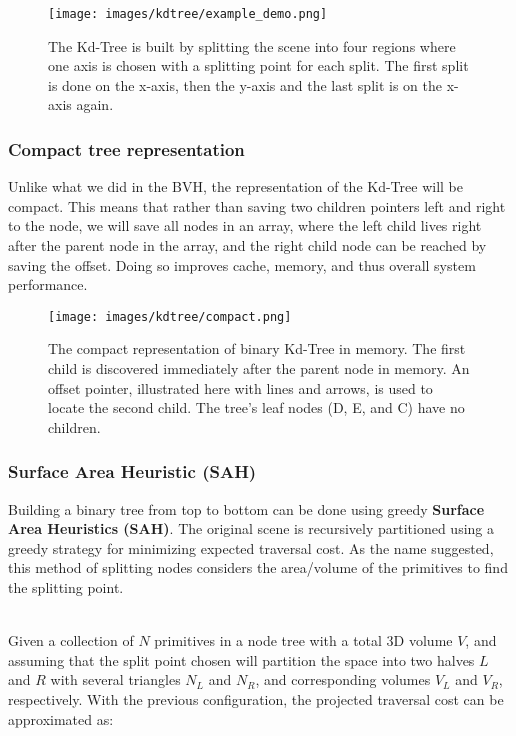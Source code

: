 \documentclass[11pt,a4paper]{article}
\begin{document}
\begin{figure}[h]	
     \centering
     \captionsetup{justification=centering,margin=2cm}
     \texttt{[image: images/kdtree/example\_demo.png]}
     \caption{The Kd-Tree is built by splitting the scene into four regions where one axis is chosen with a splitting point for each split.  The first split is done on the x-axis, then the y-axis and the last split is on the x-axis again. \protect\cite{Pharr2016}}
        \label{fig:kdtreedemo}
\end{figure}



\subsubsection{Compact tree representation}
Unlike what we did in the BVH, the representation of the Kd-Tree will be compact. This means that rather than saving two children pointers left and right to the node, we will save all nodes in an array, where the left child lives right after the parent node in the array, and the right child node can be reached by saving the offset. Doing so improves cache, memory, and thus overall system performance.


\begin{figure}[h]	
     \centering
     \captionsetup{justification=centering,margin=2cm}
     \texttt{[image: images/kdtree/compact.png]}
     \caption{The compact representation of binary Kd-Tree in memory. The first child is discovered immediately after the parent node in memory. An offset pointer, illustrated here with lines and arrows, is used to locate the second child. The tree's leaf nodes (D, E, and C) have no children. \protect\cite{Pharr2016}}
        \label{fig:dice}
\end{figure}


\subsubsection{Surface Area Heuristic (SAH)}
Building a binary tree from top to bottom can be done using greedy \textbf{Surface Area Heuristics (SAH)}. The original scene is recursively partitioned using a greedy strategy for minimizing expected traversal cost. As the name suggested, this method of splitting nodes considers the area/volume of the primitives to find the splitting point.

\noindent
\\
Given a collection of $N$ primitives in a node tree with a total 3D volume $V$, and assuming that the split point chosen will partition the space into two halves $L$ and $R$ with several triangles $N_L$ and $N_R$, and corresponding volumes $V_L$ and $V_R$, respectively. With the previous configuration, the projected traversal cost can be approximated as:
\end{document}
